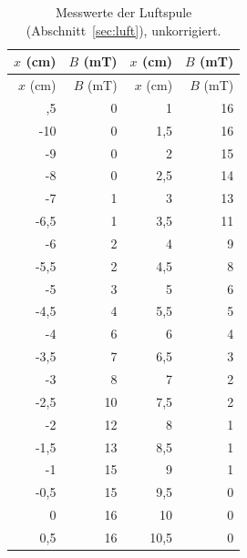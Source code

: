 \begin{longtable}{rr@{\hspace{2cm}}rr}
\caption{Messwerte der Luftspule (Abschnitt~\ref{sec:luft}), unkorrigiert.}\label{tab:exp1}\\
\toprule
$x$ (cm) & $B$ (mT) & $x$ (cm) & $B$ (mT) \\
\midrule
\endfirsthead
\toprule
$x$ (cm) & $B$ (mT) & $x$ (cm) & $B$ (mT) \\
\midrule
\endhead
\bottomrule
\endfoot
-10,5 & 0 & 1 & 16 \\
-10 & 0 & 1,5 & 16 \\
-9 & 0 & 2 & 15 \\
-8 & 0 & 2,5 & 14 \\
-7 & 1 & 3 & 13 \\
-6,5 & 1 & 3,5 & 11 \\
-6 & 2 & 4 & 9 \\
-5,5 & 2 & 4,5 & 8 \\
-5 & 3 & 5 & 6 \\
-4,5 & 4 & 5,5 & 5 \\
-4 & 6 & 6 & 4 \\
-3,5 & 7 & 6,5 & 3 \\
-3 & 8 & 7 & 2 \\
-2,5 & 10 & 7,5 & 2 \\
-2 & 12 & 8 & 1 \\
-1,5 & 13 & 8,5 & 1 \\
-1 & 15 & 9 & 1 \\
-0,5 & 15 & 9,5 & 0 \\
0 & 16 & 10 & 0 \\
0,5 & 16 & 10,5 & 0 \\
\end{longtable}
